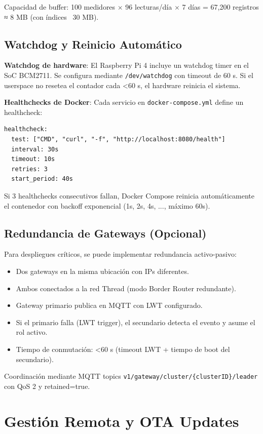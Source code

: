 Capacidad de buffer: 100 medidores $\times$ 96 lecturas/día $\times$ 7 días = 67,200 registros ≈ 8 MB (con índices ~30 MB).

\subsection{Watchdog y Reinicio Automático}

\textbf{Watchdog de hardware}: El Raspberry Pi 4 incluye un watchdog timer en el SoC BCM2711. Se configura mediante \texttt{/dev/watchdog} con timeout de 60 s. Si el userspace no resetea el contador cada <60 s, el hardware reinicia el sistema.

\textbf{Healthchecks de Docker}: Cada servicio en \texttt{docker-compose.yml} define un healthcheck:

\begin{verbatim}
healthcheck:
  test: ["CMD", "curl", "-f", "http://localhost:8080/health"]
  interval: 30s
  timeout: 10s
  retries: 3
  start_period: 40s
\end{verbatim}

Si 3 healthchecks consecutivos fallan, Docker Compose reinicia automáticamente el contenedor con backoff exponencial (1s, 2s, 4s, ..., máximo 60s).

\subsection{Redundancia de Gateways (Opcional)}

Para despliegues críticos, se puede implementar redundancia activo-pasivo:

\begin{itemize}
    \item Dos gateways en la misma ubicación con IPs diferentes.
    \item Ambos conectados a la red Thread (modo Border Router redundante).
    \item Gateway primario publica en MQTT con LWT configurado.
    \item Si el primario falla (LWT trigger), el secundario detecta el evento y asume el rol activo.
    \item Tiempo de conmutación: <60 s (timeout LWT + tiempo de boot del secundario).
\end{itemize}

Coordinación mediante MQTT topics \texttt{v1/gateway/cluster/\{clusterID\}/leader} con QoS 2 y retained=true.

\section{Gestión Remota y OTA Updates}

